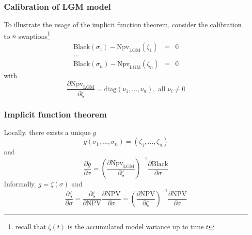 \documentclass[10pt,German]{beamer}
\begin{document}
\begin{frame}[fragile]
\frametitle{Calibration of LGM model}
To illustrate the usage of the implicit function theorem, consider the calibration to $n$ swaptions\footnote{recall that $\zeta(t)$ is the accumulated model variance up to time $t$}
\begin{eqnarray*}
\text{Black}(\sigma_1) - \text{Npv}_{\text{LGM}}(\zeta_1) &=& 0 \\
... \\
\text{Black}(\sigma_n) - \text{Npv}_{\text{LGM}}(\zeta_n) &=& 0
\end{eqnarray*}
with
\begin{equation}
\frac{\partial \text{Npv}_{\text{LGM}}}{\partial \zeta} = \text{diag}(\nu_1, ..., \nu_n), \text{ all } \nu_i \neq 0
\end{equation}
\end{frame}

\begin{frame}[fragile]
\frametitle{Implicit function theorem}
Locally, there exists a unique $g$
\begin{equation}
g(\sigma_1, ... , \sigma_n) = (\zeta_1, ..., \zeta_n)
\end{equation}
and
\begin{equation}
\frac{\partial g}{\partial \sigma} = \left( \frac{\partial \text{Npv}_{\text{LGM}}}{\partial \zeta} \right) ^ {-1} \frac{\partial \text{Black}}{\partial \sigma}
\end{equation}
Informally, $g = \zeta(\sigma)$ and
\begin{equation}
\frac{\partial \zeta}{\partial \sigma} = \frac{\partial \zeta}{\partial \text{NPV}} \frac{\partial \text{NPV}}{\partial \sigma} = 
\left( \frac{\partial \text{NPV}}{\partial \zeta}\right)^{-1} \frac{\partial \text{NPV}}{\partial \sigma}
\end{equation}
\end{frame}
\end{document}
